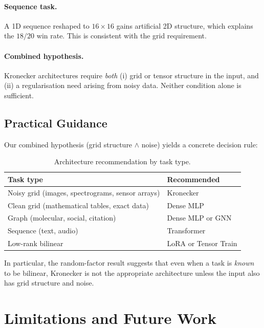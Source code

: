 \documentclass[11pt,a4paper]{article}
\begin{document}
\paragraph{Sequence task.}
A 1D sequence reshaped to $16 \times 16$ gains artificial 2D
structure, which explains the $18/20$ win rate. This is
consistent with the grid requirement.

\paragraph{Combined hypothesis.}
Kronecker architectures require \emph{both} (i) grid or tensor
structure in the input, and (ii) a regularisation need arising
from noisy data. Neither condition alone is sufficient.


\subsection{Practical Guidance}

Our combined hypothesis (grid structure $\land$ noise) yields a
concrete decision rule:

\begin{table}[h]
\centering
\caption{Architecture recommendation by task type.}
\label{tab:guide}
\small
\begin{tabular}{ll}
\toprule
Task type & Recommended \\
\midrule
Noisy grid (images, spectrograms, sensor arrays) & Kronecker \\
Clean grid (mathematical tables, exact data)     & Dense MLP \\
Graph (molecular, social, citation)              & Dense MLP or GNN \\
Sequence (text, audio)                           & Transformer \\
Low-rank bilinear                                & LoRA or Tensor Train \\
\bottomrule
\end{tabular}
\end{table}

In particular, the random-factor result suggests that even when a
task is \emph{known} to be bilinear, Kronecker is not the
appropriate architecture unless the input also has grid structure
and noise.

\section{Limitations and Future Work}
\label{sec:limitations}
\end{document}
